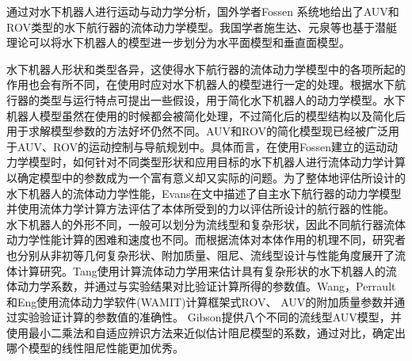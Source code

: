 通过对水下机器人进行运动与动力学分析，国外学者Fossen 系统地给出了AUV和ROV类型的水下航行器的流体动力学模型\cite{fossen1994guidance}。我国学者施生达、元泉等也基于潜艇理论可以将水下机器人的模型进一步划分为水平面模型和垂直面模型\cite{yuanchuan2001submarine,shishengda1995submarine}。

水下机器人形状和类型各异，这使得水下航行器的流体动力学模型中的各项所起的作用也会有所不同，在使用时应对水下机器人的模型进行一定的处理。根据水下航行器的类型与运行特点可提出一些假设，用于简化水下机器人的动力学模型\cite{Fossen2002Marine,fossen1994guidance,fossen2011handbook,yangke2014}。水下机器人模型虽然在使用的时候都会被简化处理，不过简化后的模型结构以及简化后用于求解模型参数的方法好坏仍然不同。AUV和ROV的简化模型现已经被广泛用于AUV、ROV的运动控制与导航规划中\cite{clement2016modeling,haugen2012modeling,prestero2001verification}。具体而言，在使用Fossen建立的运动动力学模型时，如何针对不同类型形状和应用目标的水下机器人进行流体动力学计算以确定模型中的参数成为一个富有意义却又实际的问题。为了整体地评估所设计的水下机器人的流体动力学性能，Evans在文中描述了自主水下航行器的动力学模型并使用流体力学计算方法评估了本体所受到的力以评估所设计的航行器的性能\cite{evans2004dynamics}。
水下机器人的外形不同，一般可以划分为流线型和复杂形状，因此不同航行器流体动力学性能计算的困难和速度也不同。而根据流体对本体作用的机理不同，研究者也分别从非初等几何复杂形状、附加质量、阻尼、流线型设计与性能角度展开了流体计算研究\cite{Wu2012Hydrodynamic,jones2002calculation,Tang2009Estimation,wan2017CFD,wang2001rovcfd}。Tang\cite{Tang2009Estimation}使用计算流体动力学用来估计具有复杂形状的水下机器人的流体动力学系数，并通过与实验结果对比验证计算所得的参数值。Wang\cite{wang2015numerical}，Perrault\cite{perrault2003sensitivity}和Eng\cite{eng2014added}使用流体动力学软件(WAMIT)计算框架式ROV、 AUV的附加质量参数并通过实验验证计算的参数值的准确性。 Gibson\cite{gibson2015comparison}提供八个不同的流线型AUV模型，并使用最小二乘法和自适应辨识方法来近似估计阻尼模型的系数，通过对比，确定出哪个模型的线性阻尼性能更加优秀。

